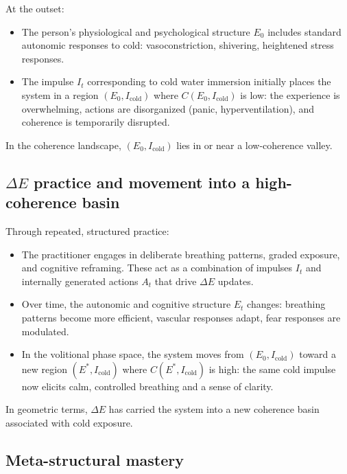 \documentclass[12pt,a4paper]{report}
\begin{document}
At the outset:

\begin{itemize}[leftmargin=2em]
    \item The person's physiological and psychological structure \(E_0\) includes standard autonomic responses to cold: vasoconstriction, shivering, heightened stress responses.
    \item The impulse \(I_t\) corresponding to cold water immersion initially places the system in a region \((E_0, I_{\mathrm{cold}})\) where \(C(E_0, I_{\mathrm{cold}})\) is low: the experience is overwhelming, actions are disorganized (panic, hyperventilation), and coherence is temporarily disrupted.
\end{itemize}

In the coherence landscape, \((E_0, I_{\mathrm{cold}})\) lies in or near a low-coherence valley.

\subsection*{$\Delta E$ practice and movement into a high-coherence basin}

Through repeated, structured practice:

\begin{itemize}[leftmargin=2em]
    \item The practitioner engages in deliberate breathing patterns, graded exposure, and cognitive reframing. These act as a combination of impulses \(I_t\) and internally generated actions \(A_t\) that drive $\Delta E$ updates.
    \item Over time, the autonomic and cognitive structure \(E_t\) changes: breathing patterns become more efficient, vascular responses adapt, fear responses are modulated.
    \item In the volitional phase space, the system moves from \((E_0, I_{\mathrm{cold}})\) toward a new region \((E^\ast, I_{\mathrm{cold}})\) where \(C(E^\ast, I_{\mathrm{cold}})\) is high: the same cold impulse now elicits calm, controlled breathing and a sense of clarity.
\end{itemize}

In geometric terms, $\Delta E$ has carried the system into a new coherence basin associated with cold exposure.

\subsection*{Meta-structural mastery}
\end{document}
